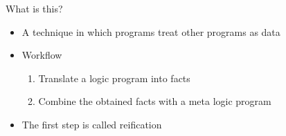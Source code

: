 \begin{frame}{What is this?}
  \bigskip
  \begin{itemize}
  \item A technique in which programs treat other programs as data
    \bigskip
  \item<2-> Workflow
    \begin{enumerate}
    \item Translate a logic program into facts
    \item Combine the obtained facts with a meta logic program
    \end{enumerate}
    \medskip
  \item<3-> The first step is called \alert{reification}
  \end{itemize}
\end{frame}
